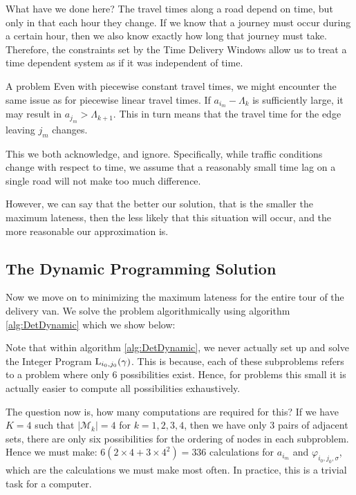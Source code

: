 What have we done here? The travel times along a road depend on time, but only in that each hour they change. If we know that a journey must occur during a certain hour, then we also know exactly how long that journey must take. Therefore, the constraints set by the Time Delivery Windows allow us to treat a time dependent system as if it was independent of time.

\begin{remark}{A problem}
	Even with piecewise constant travel times, we might encounter the same issue as for piecewise linear travel times. If $a_{i_m}-\Lambda_k$ is sufficiently large, it may result in $a_{j_m}>\Lambda_{k+1}$. This in turn means that the travel time for the edge leaving $j_m$ changes. 
	
	This we both acknowledge, and ignore. Specifically, while traffic conditions change with respect to time, we assume that a reasonably small time lag on a single road will not make too much difference. 
	
	However, we can say that the better our solution, that is the smaller the maximum lateness, then the less likely that this situation will occur, and the more reasonable our approximation is.
\end{remark}

\subsection{The Dynamic Programming Solution}
\label{sec:deterministic_dynamic_solution}
Now we move on to minimizing the maximum lateness for the entire tour of the delivery van. We solve the problem algorithmically using algorithm \ref{alg:DetDynamic} which we show below:



Note that within algorithm \ref{alg:DetDynamic}, we never actually set up and solve the Integer Program $\operatorname{L}_{i_0,j_0}(\gamma)$. This is because, each of these subproblems refers to a problem where only 6 possibilities exist. Hence, for problems this small it is actually easier to compute all possibilities exhaustively. 

The question now is, how many computations are required for this? If we have $K = 4$ such that $|\mathcal{M}_k| = 4$ for $k = 1, 2, 3, 4$, then we have only 3 pairs of adjacent sets, there are only six possibilities for the ordering of nodes in each subproblem. Hence we must make: $6( 2\times 4 + 3\times4^2 ) = 336$ calculations for $a_{i_m}$ and $\varphi_{i_0, j_0, \sigma}$, which are the calculations we must make most often. In practice, this is a trivial task for a computer.

